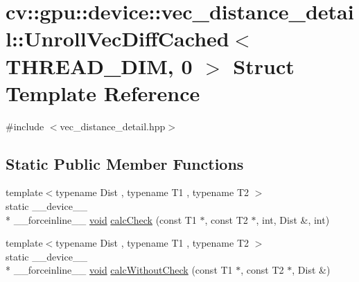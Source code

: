 \hypertarget{structcv_1_1gpu_1_1device_1_1vec__distance__detail_1_1UnrollVecDiffCached_3_01THREAD__DIM_00_010_01_4}{\section{cv\-:\-:gpu\-:\-:device\-:\-:vec\-\_\-distance\-\_\-detail\-:\-:Unroll\-Vec\-Diff\-Cached$<$ T\-H\-R\-E\-A\-D\-\_\-\-D\-I\-M, 0 $>$ Struct Template Reference}
\label{structcv_1_1gpu_1_1device_1_1vec__distance__detail_1_1UnrollVecDiffCached_3_01THREAD__DIM_00_010_01_4}
}


{\ttfamily \#include $<$vec\-\_\-distance\-\_\-detail.\-hpp$>$}

\subsection*{Static Public Member Functions}
\begin{DoxyCompactItemize}
\item 
{\footnotesize template$<$typename Dist , typename T1 , typename T2 $>$ }\\static \-\_\-\-\_\-device\-\_\-\-\_\- \\*
\-\_\-\-\_\-forceinline\-\_\-\-\_\- \hyperlink{legacy_8hpp_a8bb47f092d473522721002c86c13b94e}{void} \hyperlink{structcv_1_1gpu_1_1device_1_1vec__distance__detail_1_1UnrollVecDiffCached_3_01THREAD__DIM_00_010_01_4_aa618ed3738fcef4e858da27ec7ba629c}{calc\-Check} (const T1 $\ast$, const T2 $\ast$, int, Dist \&, int)
\item 
{\footnotesize template$<$typename Dist , typename T1 , typename T2 $>$ }\\static \-\_\-\-\_\-device\-\_\-\-\_\- \\*
\-\_\-\-\_\-forceinline\-\_\-\-\_\- \hyperlink{legacy_8hpp_a8bb47f092d473522721002c86c13b94e}{void} \hyperlink{structcv_1_1gpu_1_1device_1_1vec__distance__detail_1_1UnrollVecDiffCached_3_01THREAD__DIM_00_010_01_4_a713a6a7588569b5148445fd42dc90d46}{calc\-Without\-Check} (const T1 $\ast$, const T2 $\ast$, Dist \&)
\end{DoxyCompactItemize}


